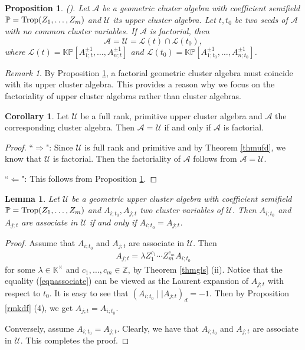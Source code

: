 \documentclass{amsart}
\newtheorem{proposition}[theorem]{Proposition}
\newtheorem{lemma}[theorem]{Lemma}
\theoremstyle{definition}
\newtheorem{corollary}[theorem]{Corollary}
\theoremstyle{remark}
\newtheorem{remark}[theorem]{Remark}
\numberwithin{equation}{section}
\begin{document}
\begin{proposition} {\rm (}\cite[Corollary 4.2]{GLS13}{\rm ).} \label{proglsau} Let $\mathcal A$ be a geometric cluster algebra with coefficient semifield  $\mathbb P={\rm Trop}(Z_1,\ldots,Z_m)$  and $\mathcal U$ its upper cluster algebra. Let $t, t_0$ be two seeds of $\mathcal A$ with no common cluster variables. If $\mathcal A$ is factorial, then $$\mathcal A=\mathcal U=\mathcal L(t)\cap\mathcal L(t_0),$$ where $\mathcal L(t)=\mathbb {KP}[A_{1;t}^{\pm1},\ldots,A_{n;t}^{\pm1}]$ and $\mathcal L(t_0)=\mathbb {KP}[A_{1;t_0}^{\pm1},\ldots,A_{n;t_0}^{\pm1}]$.
\end{proposition}
\begin{remark}
By Proposition \ref{proglsau}, a factorial geometric cluster algebra must coincide with its upper cluster algebra. This provides a reason why we focus on the factoriality of upper cluster algebras rather than cluster algebras.
\end{remark}
\begin{corollary}
Let $\mathcal U$ be a full rank, primitive upper cluster algebra and $\mathcal A$ the corresponding cluster algebra. Then $\mathcal A=\mathcal U$ if and only if $\mathcal A$ is factorial.
\end{corollary}
\begin{proof}
``$\Longrightarrow$": Since $\mathcal U$ is full rank and primitive and by Theorem \ref{thmufd}, we know that $\mathcal U$ is factorial. Then the factoriality of $\mathcal A$ follows from  $\mathcal A=\mathcal U$.

``$\Longleftarrow$": This follows from Proposition \ref{proglsau}.
\end{proof}
\begin{lemma}\label{lemassociate}
Let $\mathcal U$ be a geometric upper cluster algebra with coefficient semifield $\mathbb P={\rm Trop}(Z_1,\ldots,Z_m)$ and $A_{i;t_0}, A_{j;t}$ two cluster variables of $\mathcal U$. Then $A_{i;t_0}$ and $A_{j;t}$ are associate in $\mathcal U$ if and only if $A_{i;t_0}=A_{j;t}$.
\end{lemma}
\begin{proof}
Assume that  $A_{i;t_0}$ and $A_{j;t}$ are associate in $\mathcal U$. Then
\begin{eqnarray}\label{eqnassociate}
A_{j;t}=\lambda Z_1^{c_1}\cdots Z_m^{c_m}A_{i;t_0}
 \end{eqnarray}
 for some $\lambda\in\mathbb K^\times$ and  $c_1,\ldots,c_m\in \mathbb Z$, by Theorem \ref{thmgls} (ii). Notice that the equality (\ref{eqnassociate}) can be viewed as the Laurent expansion of $A_{j;t}$ with respect to $t_0$. It is easy to see that $(A_{i;t_0}\mid\mid A_{j;t})_d=-1$. Then by Proposition \ref{rmkdf} (4), we get $A_{j;t}=A_{i;t_0}$.

Conversely, assume $A_{i;t_0}=A_{j;t}$. Clearly, we have that   $A_{i;t_0}$ and $A_{j;t}$ are associate in $\mathcal U$. This completes the proof.
\end{proof}
\end{document}
